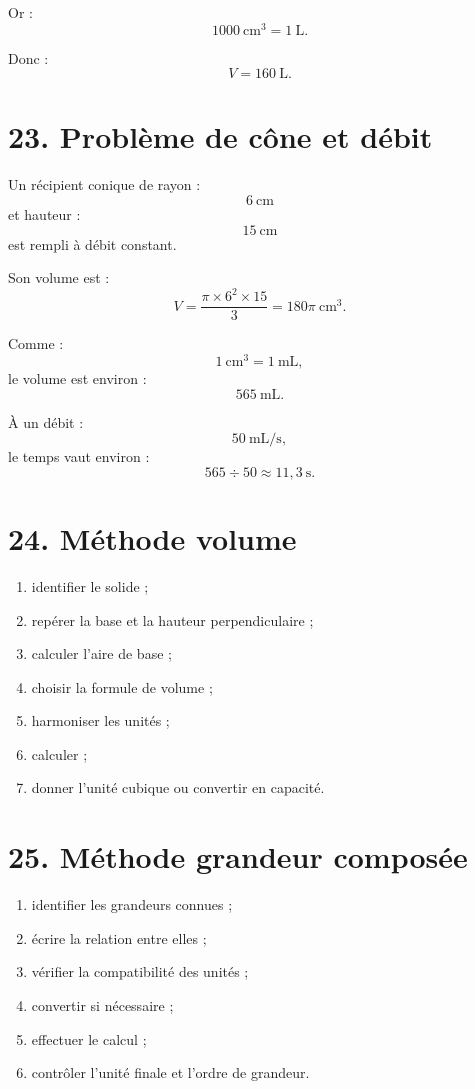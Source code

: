 Or :
\[
1000\ \text{cm}^3=1\ \text{L}.
\]

Donc :
\[
V=160\ \text{L}.
\]

\section{23. Problème de cône et débit}

Un récipient conique de rayon :
\[
6\ \text{cm}
\]
et hauteur :
\[
15\ \text{cm}
\]
est rempli à débit constant.

Son volume est :
\[
V=\dfrac{\pi\times6^2\times15}{3}
=
180\pi\ \text{cm}^3.
\]

Comme :
\[
1\ \text{cm}^3=1\ \text{mL},
\]
le volume est environ :
\[
565\ \text{mL}.
\]

À un débit :
\[
50\ \text{mL/s},
\]
le temps vaut environ :
\[
565\div50\approx11{,}3\ \text{s}.
\]

\section{24. Méthode volume}

\begin{methode}
\begin{enumerate}
\item identifier le solide ;
\item repérer la base et la hauteur perpendiculaire ;
\item calculer l'aire de base ;
\item choisir la formule de volume ;
\item harmoniser les unités ;
\item calculer ;
\item donner l'unité cubique ou convertir en capacité.
\end{enumerate}
\end{methode}

\section{25. Méthode grandeur composée}

\begin{methode}
\begin{enumerate}
\item identifier les grandeurs connues ;
\item écrire la relation entre elles ;
\item vérifier la compatibilité des unités ;
\item convertir si nécessaire ;
\item effectuer le calcul ;
\item contrôler l'unité finale et l'ordre de grandeur.
\end{enumerate}
\end{methode}

